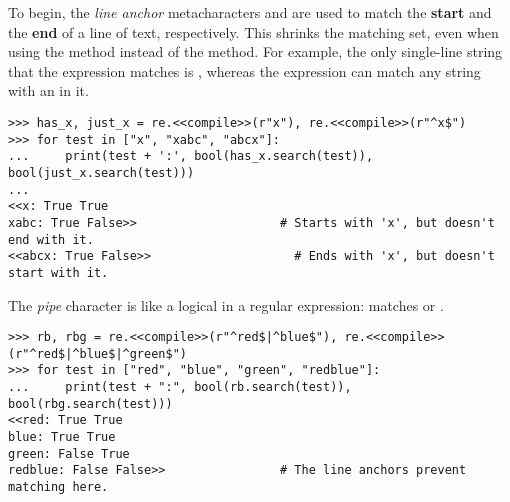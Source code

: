 To begin, the \emph{line anchor} metacharacters \li{^} and \li{\$} are used to match the \textbf{start} and the \textbf{end} of a line of text, respectively.
This shrinks the matching set, even when using the  method instead of the  method.
For example, the only single-line string that the expression  matches is , whereas the expression  can match any string with an  in it.

\begin{lstlisting}
>>> has_x, just_x = re.<<compile>>(r"x"), re.<<compile>>(r"^x$")
>>> for test in ["x", "xabc", "abcx"]:
...     print(test + ':', bool(has_x.search(test)), bool(just_x.search(test)))
...
<<x: True True
xabc: True False>>                    # Starts with 'x', but doesn't end with it.
<<abcx: True False>>                    # Ends with 'x', but doesn't start with it.
\end{lstlisting}

\begin{comment}
An added benefit of using \li{'^'} and \li{'\$'} is that they allow you to search across multiple lines.
For example, how would we match \li{"World"} in the string \mbox{\li{"Hello\\nWorld"}}?
Using \li{re.MULTILINE} in the \li{re.search} function will allow us to match at the beginning of each new line, instead of just the beginning of the string.
Since we have seen two ways to match strings with regex expressions, the following shows two ways to implement multiline searching:

\begin{lstlisting}
>>>bool(re.search("^W","Hello\nWorld"))
<<False>>
>>>bool(re.search("^W","Hello\nWorld", re.MULTILINE))
<<True>>
>>>pattern1 = re<<.compile>>("^W")
>>>pattern2 = re<<.compile>>("^W", re.MULTILINE)
>>>bool(pattern1.search("Hello\nWorld"))
<<False>>
>>>bool(pattern2.search("Hello\nWorld"))
<<True>>
\end{lstlisting}

For simplicity, the rest of the lab will focus on single line matching.
\end{comment}

The \emph{pipe} character \li{|} is like a logical  in a regular expression:  matches  or .
\begin{lstlisting}
>>> rb, rbg = re.<<compile>>(r"^red$|^blue$"), re.<<compile>>(r"^red$|^blue$|^green$")
>>> for test in ["red", "blue", "green", "redblue"]:
...     print(test + ":", bool(rb.search(test)), bool(rbg.search(test)))
<<red: True True
blue: True True
green: False True
redblue: False False>>                # The line anchors prevent matching here.
\end{lstlisting}

